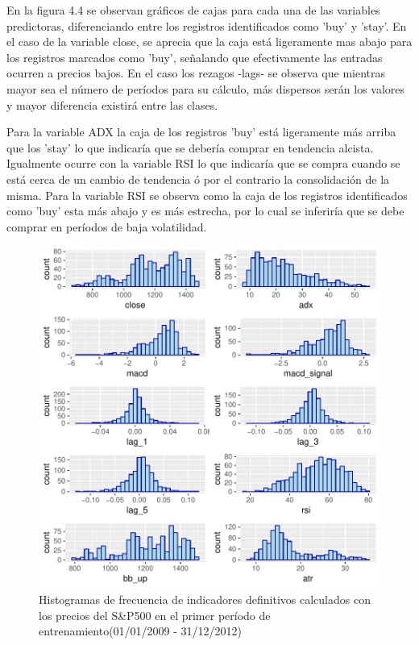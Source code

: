 \documentclass[a4paper,12pt]{Latex/Classes/PhDthesisPSnPDF}
\begin{document}
En la figura 4.4 se observan gráficos de cajas para cada una de las variables predictoras, diferenciando entre los registros identificados como 'buy' y 'stay'. En el caso de la variable close, se aprecia que la caja está ligeramente mas abajo para los registros marcados como 'buy', señalando que efectivamente las entradas ocurren a precios bajos. En el caso los rezagos -lags- se observa que mientras mayor sea el número de períodos para su cálculo, más dispersos serán los valores y mayor diferencia existirá entre las clases.

Para la variable ADX la caja de los registros 'buy' está ligeramente más arriba que los 'stay' lo que indicaría que se debería comprar en tendencia alcista. Igualmente ocurre con la variable RSI lo que indicaría que se compra cuando se está cerca de un cambio de tendencia ó por el contrario la consolidación de la misma. Para la variable RSI se observa como la caja de los registros identificados como 'buy' esta más abajo y es más estrecha, por lo cual se inferiría que se debe comprar en períodos de baja volatilidad.

\begin{figure}[H]
\centering
\includegraphics{main-010}
\caption{Histogramas de frecuencia de indicadores definitivos calculados con los precios del S\&P500 en el primer período de entrenamiento(01/01/2009 - 31/12/2012)}
\end{figure}
\end{document}
